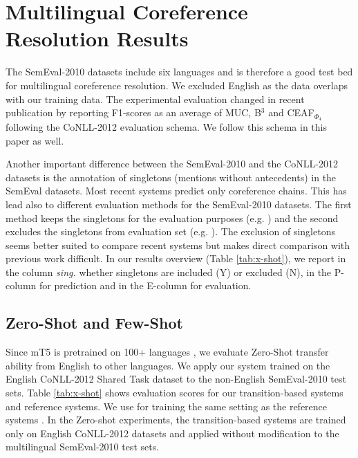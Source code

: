 \documentclass[11pt,a4paper]{article}
\begin{document}
\section{Multilingual Coreference Resolution Results}
\label{sec:multilingual}

The SemEval-2010 datasets \cite{recasens-etal-2010-semeval} include six languages and is therefore a good test bed for multilingual coreference resolution. We excluded English as the data overlaps with our training data. 
The experimental evaluation changed in recent publication by reporting F1-scores as an average of MUC, B$^3$ and CEAF$_{\Phi_4}$ following the CoNLL-2012 evaluation schema. We follow this schema  in this paper as well. 

Another important difference between the SemEval-2010 and the CoNLL-2012 datasets is the annotation of singletons (mentions without antecedents) in the SemEval datasets. 
Most recent systems predict only coreference chains. This has lead also to different evaluation methods for the SemEval-2010 datasets. The first method keeps the singletons for the evaluation purposes (e.g. \cite{xia-van-durme-2021-moving}) and the second excludes the singletons from evaluation set (e.g. \cite{roesiger-kuhn-2016-ims,schroder-etal-2021-neural,bitew-etal-2021-lazy}). The exclusion of singletons seems better suited to compare recent systems but makes direct comparison with previous work difficult. In our results overview (Table \ref{tab:x-shot}), we report in the column {\em sing.} whether singletons are included (Y) or excluded (N), in the P-column for prediction and in the E-column for evaluation.  


\subsection{Zero-Shot and Few-Shot}

Since mT5 is pretrained on 100+ languages \cite{xue-etal-2021-mt5}, we evaluate Zero-Shot transfer ability from English to other languages. We apply our system trained on the English CoNLL-2012 Shared Task dataset to the non-English SemEval-2010 test sets. Table \ref{tab:x-shot} shows evaluation scores for our transition-based systems and reference systems. 
We use for training the same setting as the reference systems  \cite{kobdani-schutze-2010-sucre,roesiger-kuhn-2016-ims,schroder-etal-2021-neural}. In the Zero-shot experiments, the transition-based systems are trained only on English CoNLL-2012 datasets and applied without modification to the multilingual SemEval-2010 test sets. 
\end{document}
